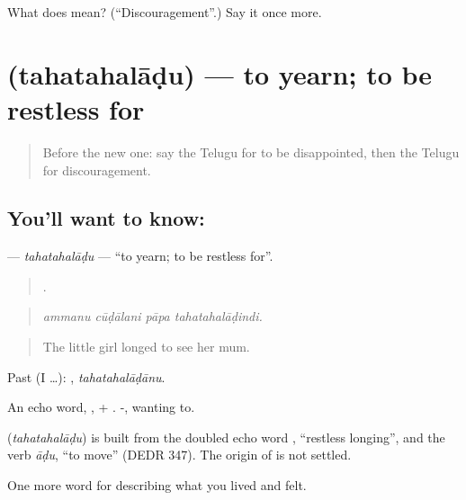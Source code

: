 \begin{tcolorbox}[breakable,colback=teal!4,colframe=teal!35!black,title={Before you move on}]
What does  mean? (\textquotedblleft{}Discouragement\textquotedblright{}.) Say it once more.
\end{tcolorbox}
\section[\texorpdfstring{\te{తహతహలాడు} (tahatahalāḍu)}{తహతహలాడు (tahatahalāḍu)}]{ (tahatahalāḍu) — to yearn; to be restless for}

\label{lesson:TE-C502-tahatahaladu}



\begin{quote}
Before the new one: say the Telugu for to be disappointed, then the Telugu for discouragement.
\end{quote}

\subsection*{You'll want to know: }
\textbf{} — \emph{tahatahalāḍu} — \textquotedblleft{}to yearn; to be restless for\textquotedblright{}.

\begin{quote}
   .
\end{quote}

\begin{quote}
\emph{ammanu cūḍālani pāpa tahatahalāḍindi.}
\end{quote}

\begin{quote}
The little girl longed to see her mum.
\end{quote}

Past (I …): , \emph{tahatahalāḍānu}.

An echo word, , + . -, wanting to.

\begin{cousinweb}
\textbf{} (\emph{tahatahalāḍu}) is built from the doubled echo word , \textquotedblleft{}restless longing\textquotedblright{}, and the verb \emph{āḍu}, \textquotedblleft{}to move\textquotedblright{} (DEDR 347). The origin of  is not settled.
\end{cousinweb}

\begin{grammarlens}[title={What you've built}]
One more word for describing what you lived and felt.
\end{grammarlens}

